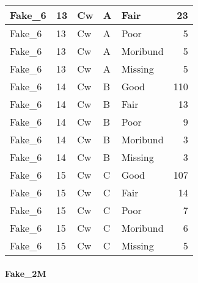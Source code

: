 \documentclass[
]{article}
\begin{document}
\begin{tabular}{l|l|l|l|l|r}
\hline
Fake\_6 & 13 & Cw & A & Fair & 23\\
\hline
Fake\_6 & 13 & Cw & A & Poor & 5\\
\hline
Fake\_6 & 13 & Cw & A & Moribund & 5\\
\hline
Fake\_6 & 13 & Cw & A & Missing & 5\\
\hline
Fake\_6 & 14 & Cw & B & Good & 110\\
\hline
Fake\_6 & 14 & Cw & B & Fair & 13\\
\hline
Fake\_6 & 14 & Cw & B & Poor & 9\\
\hline
Fake\_6 & 14 & Cw & B & Moribund & 3\\
\hline
Fake\_6 & 14 & Cw & B & Missing & 3\\
\hline
Fake\_6 & 15 & Cw & C & Good & 107\\
\hline
Fake\_6 & 15 & Cw & C & Fair & 14\\
\hline
Fake\_6 & 15 & Cw & C & Poor & 7\\
\hline
Fake\_6 & 15 & Cw & C & Moribund & 6\\
\hline
Fake\_6 & 15 & Cw & C & Missing & 5\\
\hline
\end{tabular}

\hypertarget{fake_2m-1}{%
\paragraph{Fake\_2M}\label{fake_2m-1}}
\end{document}
